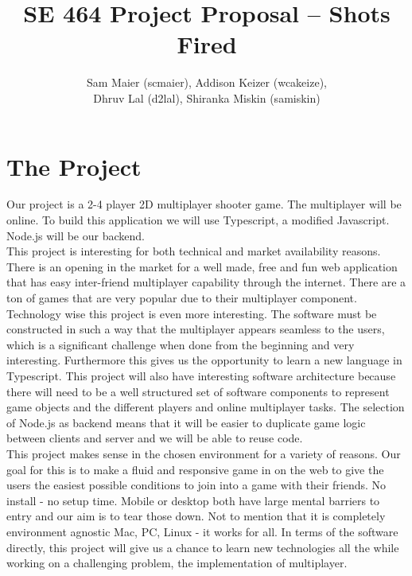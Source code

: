 \documentclass[11pt, oneside]{article}   	%
\title{SE 464 Project Proposal -- Shots Fired}
\author{Sam Maier (scmaier), Addison Keizer (wcakeize), \\Dhruv Lal (d2lal), Shiranka Miskin (samiskin)}
\begin{document}
\maketitle
\section{The Project}
\hspace*{5mm} Our project is a 2-4 player 2D multiplayer shooter game. The multiplayer will be online. To build this application we will use Typescript, a modified Javascript. Node.js will be our backend. \\

This project is interesting for both technical and market availability reasons. There is an opening in the market for a well made, free and fun web application that has easy inter-friend multiplayer capability through the internet. There are a ton of games that are very popular due to their multiplayer component.   \\

Technology wise this project is even more interesting. The software must be constructed in such a way that the multiplayer appears seamless to the users, which is a significant challenge when done from the beginning and very interesting. Furthermore this gives us the opportunity to learn a new language in Typescript. This project will also have interesting software architecture because there will need to be a well structured set of software components to represent game objects and the different players and online multiplayer tasks. The selection of Node.js as backend means that it will be easier to duplicate game logic between clients and server and we will be able to reuse code. \\

This project makes sense in the chosen environment for a variety of reasons. Our goal for this is to make a fluid and responsive game in on the web to give the users the easiest possible conditions to join into a game with their friends. No install - no setup time. Mobile or desktop both have large mental barriers to entry and our aim is to tear those down. Not to mention that it is completely environment agnostic Mac, PC, Linux - it works for all. In terms of the software directly, this project will give us a chance to learn new technologies all the while working on a challenging problem, the implementation of multiplayer.
\end{document}
